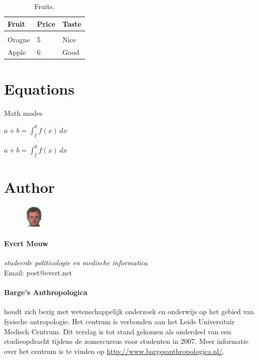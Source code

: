 \begin{table}[H]
	\centering
	\begin{tabular}{ l l l }
		Fruit	&Price	&Taste\\
		\hline \\
		Oragne	&5	&Nice\\
		Apple	&6	&Good\\
	\end{tabular}
	\caption{Fruits.}
	\label{fruits}
\end{table}

\section{Equations}

Math modes

$a+b=\int_{\xi}^{\theta} f(x)\,dx$

$a+b=∫_ξ^θ f(x)\,dx$

\section{Author}

\begin{figure}
		\includegraphics[width=30pt]{evert.jpg}
\end{figure}

\paragraph{Evert Mouw}
\textit{studeerde politicologie en medische informatica}\\
Email: post@evert.net

\paragraph{Barge's Anthropologica} houdt zich bezig met wetenschappelijk onderzoek en onderwijs op het gebied van fysische antropologie. Het centrum is verbonden aan het Leids Universitair Medisch Centrum. Dit verslag is tot stand gekomen als onderdeel van een studieopdracht tijdens de zomercursus voor studenten in 2007. Meer informatie over het centrum is te vinden op \url{http://www.bargesanthropologica.nl/}.
